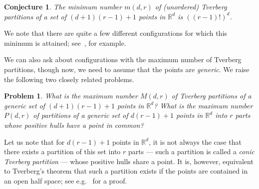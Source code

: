 \documentclass[12pt,english,reqno]{amsart}
\theoremstyle{plain}
\newtheorem{conj}[thm]{Conjecture}
\newtheorem{prob}[thm]{Problem}
\theoremstyle{remark}
\numberwithin{figure}{section}
\numberwithin{equation}{section}
\def\rr{\mathbb{R}}
\newcommand{\darkblue}{\color{darkblue}}
\newcommand{\defnb}[1]{\emph{\darkblue #1}}
\begin{document}
\begin{conj}\label{conj:Sierksma}
The minimum number $m(d,r)$ of (unordered) Tverberg partitions of a set of $ (d+1)(r-1)+1$ points in $\rr^d$ is $ ((r-1)!)^d$.
\end {conj}
We note that there are quite a few different configurations for which this minimum is attained; see~\cite{Whi17,BLN17}, for example.

We can also ask about configurations with the maximum number of Tverberg partitions, though now, we need to assume that the points are \emph{generic}. We raise the following two closely related problems.

\begin{prob}
What is the maximum number $M(d,r)$ of Tverberg partitions of a generic set of $ (d+1)(r-1)+1$ points in $ \mathbb R^d$? What is the maximum number $P(d,r)$ of partitions of a generic set of $ d(r-1)+1$ points in $ \mathbb R^d$ into $ r$ parts whose positive hulls have a point in common?
\end {prob}
Let us note that for $d(r-1)+1$ points in $ \mathbb R^d$, it is not always the case that there exists a partition of this set into $r$ parts --- such a partition is called a \defnb{conic Tverberg partition} --- whose positive hulls share a point. It is, however, equivalent to Tverberg's theorem that such a partition exists if the points are contained in an open half space; see e.g.~\cite{Rou01} for a proof.
\end{document}
